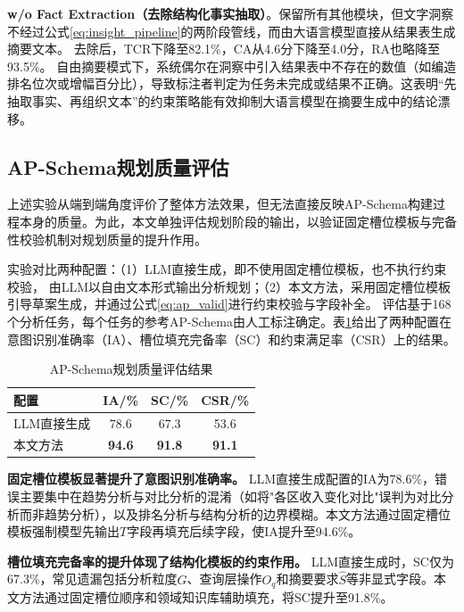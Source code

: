 \textbf{w/o Fact Extraction（去除结构化事实抽取）}。保留所有其他模块，但文字洞察不经过公式\eqref{eq:insight_pipeline}的两阶段管线，而由大语言模型直接从结果表生成摘要文本。
去除后，TCR下降至82.1\%，CA从4.6分下降至4.0分，RA也略降至93.5\%。
自由摘要模式下，系统偶尔在洞察中引入结果表中不存在的数值（如编造排名位次或增幅百分比），导致标注者判定为任务未完成或结果不正确。这表明“先抽取事实、再组织文本”的约束策略能有效抑制大语言模型在摘要生成中的结论漂移。

\subsection{AP-Schema规划质量评估}

上述实验从端到端角度评价了整体方法效果，但无法直接反映AP-Schema构建过程本身的质量。为此，本文单独评估规划阶段的输出，以验证固定槽位模板与完备性校验机制对规划质量的提升作用。

实验对比两种配置：（1）LLM直接生成，即不使用固定槽位模板，也不执行约束校验，
由LLM以自由文本形式输出分析规划；（2）本文方法，采用固定槽位模板引导草案生成，并通过公式\eqref{eq:ap_valid}进行约束校验与字段补全。
评估基于168个分析任务，每个任务的参考AP-Schema由人工标注确定。表\ref{tab:chap04_planning_quality}给出了两种配置在意图识别准确率（IA）、槽位填充完备率（SC）和约束满足率（CSR）上的结果。

\begin{table}[htbp]
	\setlength{\abovecaptionskip}{5pt}
	\setlength{\belowcaptionskip}{5pt}
	\caption{AP-Schema规划质量评估结果}\label{tab:chap04_planning_quality}
	\centering
	\begin{tabular}{lccc}
		\toprule
		配置 & IA/\% & SC/\% & CSR/\% \\
		\midrule
		LLM直接生成 & 78.6 & 67.3 & 53.6 \\
		本文方法 & \textbf{94.6} & \textbf{91.8} & \textbf{91.1} \\
		\bottomrule
	\end{tabular}
\end{table}

\textbf{固定槽位模板显著提升了意图识别准确率。} LLM直接生成配置的IA为78.6\%，错误主要集中在趋势分析与对比分析的混淆（如将"各区收入变化对比"误判为对比分析而非趋势分析），以及排名分析与结构分析的边界模糊。本文方法通过固定槽位模板强制模型先输出$T$字段再填充后续字段，使IA提升至94.6\%。

\textbf{槽位填充完备率的提升体现了结构化模板的约束作用。} LLM直接生成时，SC仅为67.3\%，常见遗漏包括分析粒度$G$、查询层操作$O_q$和摘要要求$\hat{S}$等非显式字段。本文方法通过固定槽位顺序和领域知识库辅助填充，将SC提升至91.8\%。

